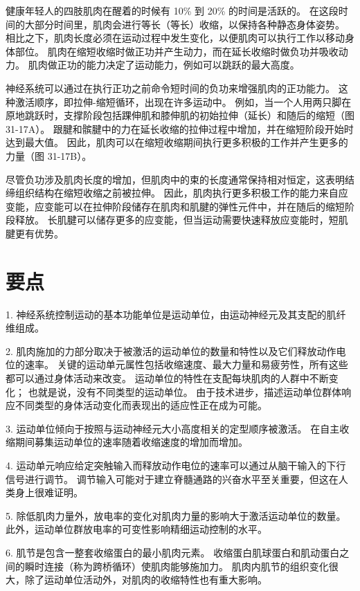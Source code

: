 健康年轻人的四肢肌肉在醒着的时候有 10\% 到 20\% 的时间是活跃的。 在这段时间的大部分时间里，肌肉会进行等长（等长）收缩，以保持各种静态身体姿势。 相比之下，肌肉长度必须在运动过程中发生变化，以便肌肉可以执行工作以移动身体部位。 肌肉在缩短收缩时做正功并产生动力，而在延长收缩时做负功并吸收动力。 肌肉做正功的能力决定了运动能力，例如可以跳跃的最大高度。

神经系统可以通过在执行正功之前命令短时间的负功来增强肌肉的正功能力。 这种激活顺序，即拉伸-缩短循环，出现在许多运动中。 例如，当一个人用两只脚在原地跳跃时，支撑阶段包括踝伸肌和膝伸肌的初始拉伸（延长）和随后的缩短（图 31-17A）。 跟腱和髌腱中的力在延长收缩的拉伸过程中增加，并在缩短阶段开始时达到最大值。 因此，肌肉可以在缩短收缩期间执行更多积极的工作并产生更多的力量（图 31-17B）。

尽管负功涉及肌肉长度的增加，但肌肉中的束的长度通常保持相对恒定，这表明结缔组织结构在缩短收缩之前被拉伸。 因此，肌肉执行更多积极工作的能力来自应变能，应变能可以在拉伸阶段储存在肌肉和肌腱的弹性元件中，并在随后的缩短阶段释放。 长肌腱可以储存更多的应变能，但当运动需要快速释放应变能时，短肌腱更有优势。

\section{要点}
1. 神经系统控制运动的基本功能单位是运动单位，由运动神经元及其支配的肌纤维组成。 

2. 肌肉施加的力部分取决于被激活的运动单位的数量和特性以及它们释放动作电位的速率。 关键的运动单元属性包括收缩速度、最大力量和易疲劳性，所有这些都可以通过身体活动来改变。 运动单位的特性在支配每块肌肉的人群中不断变化； 也就是说，没有不同类型的运动单位。 由于技术进步，描述运动单位群体响应不同类型的身体活动变化而表现出的适应性正在成为可能。 

3. 运动单位倾向于按照与运动神经元大小高度相关的定型顺序被激活。 在自主收缩期间募集运动单位的速率随着收缩速度的增加而增加。 

4. 运动单元响应给定突触输入而释放动作电位的速率可以通过从脑干输入的下行信号进行调节。 调节输入可能对于建立脊髓通路的兴奋水平至关重要，但这在人类身上很难证明。 

5. 除低肌肉力量外，放电率的变化对肌肉力量的影响大于激活运动单位的数量。 此外，运动单位群放电率的可变性影响精细运动控制的水平。 

6. 肌节是包含一整套收缩蛋白的最小肌肉元素。 收缩蛋白肌球蛋白和肌动蛋白之间的瞬时连接（称为跨桥循环）使肌肉能够施加力。 肌肉内肌节的组织变化很大，除了运动单位活动外，对肌肉的收缩特性也有重大影响。 

